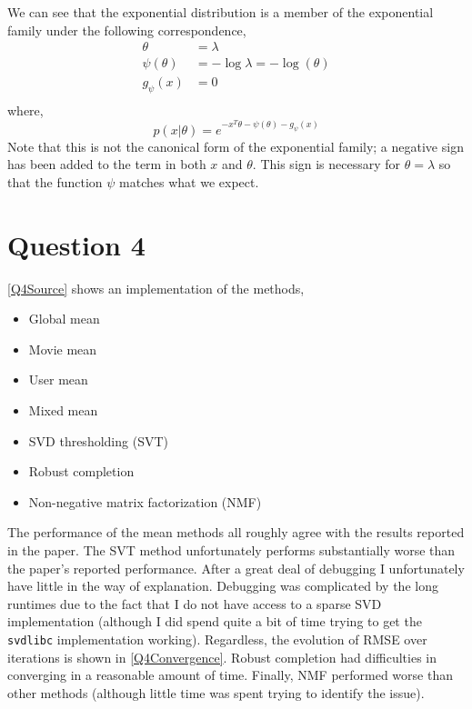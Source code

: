 \documentclass{article}
\begin{document}
\begin{enumerate}
  We can see that the exponential distribution is a member of the
  exponential family under the following correspondence,
  \begin{align*}
    \theta & = \lambda \\
    \psi(\theta) & = -\log \lambda = -\log(\theta) \\
    g_\psi(x) & = 0 \\
  \end{align*}
  where,
  \[ p(x \vert \theta) = e^{-x^T \theta - \psi(\theta) - g_\psi(x)} \]
  Note that this is not the canonical form of the exponential family;
a negative sign has been added to the term in both $x$ and
$\theta$. This sign is necessary for $\theta = \lambda$ so that the
function $\psi$ matches what we expect.
\end{enumerate}

\section{Question 4}

\ref{Q4Source} shows an implementation of the methods,

\begin{itemize}
\item Global mean
\item Movie mean
\item User mean
\item Mixed mean
\item SVD thresholding (SVT)
\item Robust completion
\item Non-negative matrix factorization (NMF)
\end{itemize}

The performance of the mean methods all roughly agree with the results
reported in the paper. The SVT method unfortunately performs
substantially worse than the paper's reported performance. After a
great deal of debugging I unfortunately have little in the way of
explanation. Debugging was complicated by the long runtimes due to the
fact that I do not have access to a sparse SVD
implementation (although I did spend quite a bit of time trying to get
the {\tt svdlibc} implementation working). Regardless, the evolution
of RMSE over iterations is shown in \ref{Q4Convergence}. Robust
completion had difficulties in converging in a reasonable amount of
time. Finally, NMF performed worse than other methods (although little
time was spent trying to identify the issue).
\end{document}
